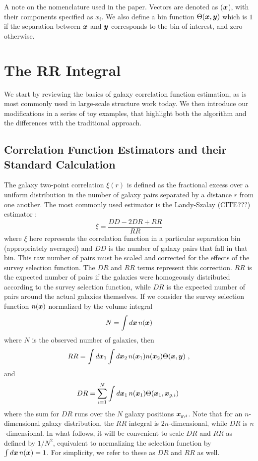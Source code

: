 \documentclass[usenatbib]{mn2e}
\begin{document}
A note on the nomenclature used in the paper. Vectors are denoted as (${\bm x}$),
with their components specified as $x_{i}$. We also define a bin function
$\Theta({\bm x},{\bm y})$ which is $1$ if the separation between ${\bm x}$ and ${\bm y}$
corresponds to the bin of interest, and zero otherwise. 

\section{The RR Integral}
\label{sec:RR}

We start by reviewing the basics of galaxy correlation function estimation, as 
is most commonly used in large-scale structure work today. We then introduce 
our modifications in a series of toy examples, that highlight both the algorithm
and the differences with the traditional approach.

\subsection{Correlation Function Estimators and their Standard Calculation}

The galaxy two-point correlation $\xi(r)$ is defined as the fractional excess
over a uniform distribution in the number of galaxy pairs separated by a
distance $r$ from one another. The most commonly used estimator is the
Landy-Szalay (CITE???) estimator :
\begin{equation}
\xi = \frac{DD - 2 DR + RR}{RR}
\end{equation}
where $\xi$ here represents the correlation function in a particular separation
bin (appropriately averaged) and $DD$ is the number of galaxy pairs that fall in
that bin. This raw number of pairs must be scaled and corrected for the effects
of the survey selection function. The $DR$ and $RR$ terms represent this correction. 
$RR$ is the expected number of pairs
if the galaxies were homogeously distributed according to the survey selection
function, while $DR$ is the expected number of pairs around the actual galaxies
themselves. If we consider the survey selection function $n({\bm x})$ normalized
by the volume integral
\begin{equation}
N = \int d{\bm x}\,n({\bm x})
\end{equation}
where $N$ is the observed number of galaxies, then 
\begin{equation}
RR = \int d{\bm x}_1  \int d{\bm x}_2 \,n({\bm x}_1) n({\bm x}_2) \Theta({\bm x},{\bm y}) \,\,,
\label{eq:RRdef}
\end{equation}
and 
\begin{equation}
DR = \sum_{i=1}^{N} \int d{\bm x}_1 \,n({\bm x}_1) \Theta({\bm x}_1, {\bm x}_{g,i}) \,\,
\label{eq:DRdef}
\end{equation}
where the sum for $DR$ runs over the $N$ galaxy positions ${\bm x}_{g,i}$. 
Note that for an $n$-dimensional galaxy distribution, the $RR$ integral is
$2n$-dimensional, while $DR$ is $n$-dimensional. In what follows, it will be
convenient to scale $DR$ and $RR$ as defined by $1/N^2$, equivalent to
normalizing the selection function by $\int d{\bm x}\,n({\bm x})=1$. For simplicity, we
refer to these as $DR$ and $RR$ as well. 
\end{document}
